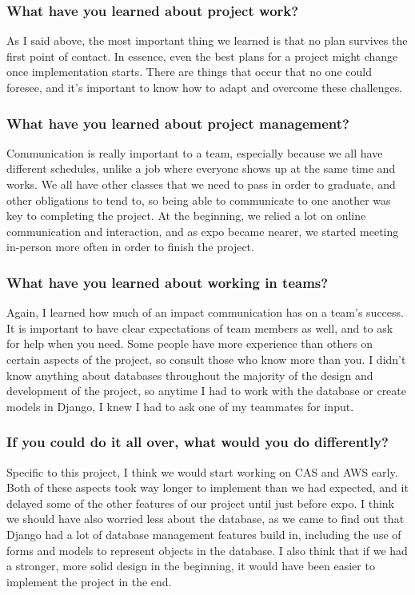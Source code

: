 \subsubsection{What have you learned about project work?}
\noindent As I said above, the most important thing we learned is that no plan survives the first point of contact. In essence, even the best plans for a project might change once implementation starts. There are things that occur that no one could foresee, and it's important to know how to adapt and overcome these challenges.\\

\subsubsection{What have you learned about project management?}
\noindent Communication is really important to a team, especially because we all have different schedules, unlike a job where everyone shows up at the same time and works. We all have other classes that we need to pass in order to graduate, and other obligations to tend to, so being able to communicate to one another was key to completing the project. At the beginning, we relied a lot on online communication and interaction, and as expo became nearer, we started meeting in-person more often in order to finish the project.\\

\subsubsection{What have you learned about working in teams?}
\noindent Again, I learned how much of an impact communication has on a team's success. It is important to have clear expectations of team members as well, and to ask for help when you need. Some people have more experience than others on certain aspects of the project, so consult those who know more than you. I didn't know anything about databases throughout the majority of the design and development of the project, so anytime I had to work with the database or create models in Django, I knew I had to ask one of my teammates for input.\\

\subsubsection{If you could do it all over, what would you do differently?}
\noindent Specific to this project, I think we would start working on CAS and AWS early. Both of these aspects took way longer to implement than we had expected, and it delayed some of the other features of our project until just before expo. I think we should have also worried less about the database, as we came to find out that Django had a lot of database management features build in, including the use of forms and models to represent objects in the database. I also think that if we had a stronger, more solid design in the beginning, it would have been easier to implement the project in the end.\\


